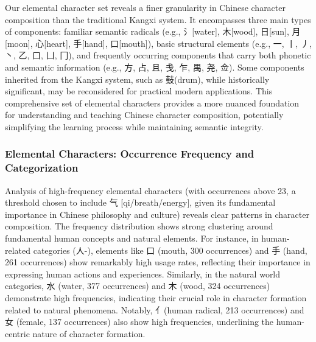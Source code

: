 Our elemental character set reveals a finer granularity in Chinese
character composition than the traditional Kangxi system. It encompasses
three main types of components: familiar semantic radicals (e.g.,
氵{[}water{]}, 木{[}wood{]}, 日{[}sun{]}, 月{[}moon{]}, 心{[}heart{]},
手{[}hand{]}, 口{[}mouth{]}), basic structural elements (e.g., 一, 丨,
丿, 丶, 乙, 口, 凵, 冂), and frequently occurring components that carry
both phonetic and semantic information (e.g., 方, 占, 且, 戋, 乍, 禺,
尧, 佥). Some components inherited from the Kangxi system, such as
鼓(drum), while historically significant, may be reconsidered for
practical modern applications. This comprehensive set of elemental
characters provides a more nuanced foundation for understanding and
teaching Chinese character composition, potentially simplifying the
learning process while maintaining semantic integrity.

\subsubsection{Elemental Characters: Occurrence Frequency and
Categorization}\label{elemental-characters-occurrence-frequency-and-categorization}

Analysis of high-frequency elemental characters (with occurrences above
23, a threshold chosen to include 气 {[}qi/breath/energy{]}, given its
fundamental importance in Chinese philosophy and culture) reveals clear
patterns in character composition. The frequency distribution shows
strong clustering around fundamental human concepts and natural
elements. For instance, in human-related categories (人-), elements like
口 (mouth, 300 occurrences) and 手 (hand, 261 occurrences) show
remarkably high usage rates, reflecting their importance in expressing
human actions and experiences. Similarly, in the natural world
categories, 水 (water, 377 occurrences) and 木 (wood, 324 occurrences)
demonstrate high frequencies, indicating their crucial role in character
formation related to natural phenomena. Notably, 亻(human radical, 213
occurrences) and 女 (female, 137 occurrences) also show high
frequencies, underlining the human-centric nature of character
formation.

